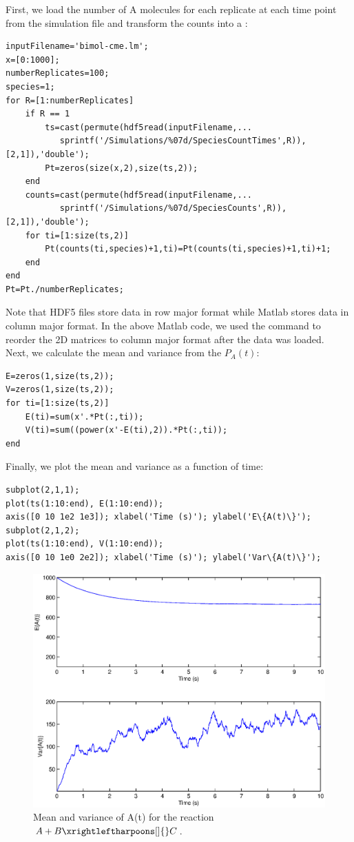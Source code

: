 First, we load the number of A molecules for each replicate at each time point from the simulation file and transform the counts into a :
{\small\begin{verbatim}
inputFilename='bimol-cme.lm';
x=[0:1000];
numberReplicates=100;
species=1;
for R=[1:numberReplicates]
    if R == 1
        ts=cast(permute(hdf5read(inputFilename,...
           sprintf('/Simulations/%07d/SpeciesCountTimes',R)),[2,1]),'double');
        Pt=zeros(size(x,2),size(ts,2));
    end
    counts=cast(permute(hdf5read(inputFilename,...
           sprintf('/Simulations/%07d/SpeciesCounts',R)),[2,1]),'double');
    for ti=[1:size(ts,2)]
        Pt(counts(ti,species)+1,ti)=Pt(counts(ti,species)+1,ti)+1;
    end
end
Pt=Pt./numberReplicates;
\end{verbatim}}

Note that HDF5 files store data in row major format while Matlab stores data in column major format. In the above Matlab code, we used the  command to reorder the 2D matrices to column major format after the data was loaded.\\

Next, we calculate the mean and variance from the $P_A(t)$:
{\small\begin{verbatim}
E=zeros(1,size(ts,2));
V=zeros(1,size(ts,2));
for ti=[1:size(ts,2)]
    E(ti)=sum(x'.*Pt(:,ti));
    V(ti)=sum((power(x'-E(ti),2)).*Pt(:,ti));
end
\end{verbatim}}

Finally, we plot the mean and variance as a function of time:
{\small\begin{verbatim}
subplot(2,1,1);
plot(ts(1:10:end), E(1:10:end));
axis([0 10 1e2 1e3]); xlabel('Time (s)'); ylabel('E\{A(t)\}');
subplot(2,1,2);
plot(ts(1:10:end), V(1:10:end));
axis([0 10 1e0 2e2]); xlabel('Time (s)'); ylabel('Var\{A(t)\}');
\end{verbatim}}

\begin{figure}
\centerline{\includegraphics[width=6in]{Tutorials/MatlabPlot.eps}}
\caption{Mean and variance of A(t) for the reaction $A + B \xrightleftharpoons[]{} C$.}
\label{fig:MatlabPlot}
\end{figure}

